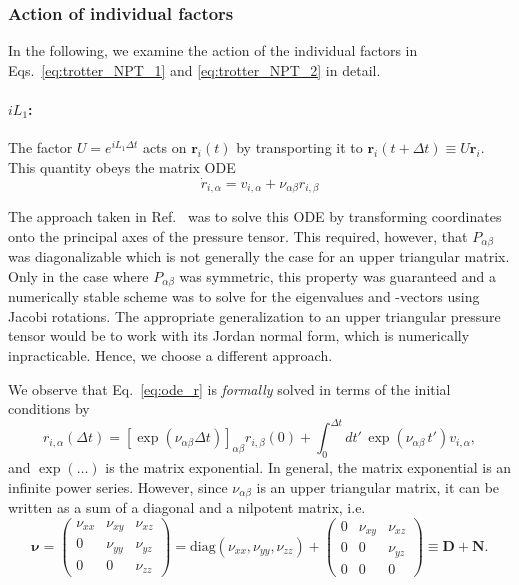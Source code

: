 \documentclass[12pt,letter]{article}
\renewcommand{\vec}[1]{\mathbf{#1}}
\begin{document}
\subsubsection{Action of individual factors}
In the following, we examine the action of the individual factors in
Eqs.~\eqref{eq:trotter_NPT_1} and \eqref{eq:trotter_NPT_2} in detail.

\paragraph{$i L_1$:} The factor $U=e^{i L_1 \Delta t}$ acts on $\vec r_i(t)$ by
transporting it to $\vec r_i(t+\Delta t) \equiv U \vec r_i$.  This quantity obeys the matrix ODE
\begin{equation}
\dot{r}_{i,\alpha} = v_{i,\alpha} + \nu_{\alpha\beta} r_{i,\beta} \label{eq:ode_r}
\end{equation}

The approach taken in Ref.~\cite{Yu2010} was to solve this ODE by transforming coordinates onto the principal axes of the pressure tensor. This required, however, that  $P_{\alpha\beta}$ was diagonalizable which is not generally the case for an upper triangular matrix. Only in the case
where $P_{\alpha\beta}$ was symmetric, this property was guaranteed and a numerically stable scheme was to solve for the eigenvalues and -vectors using Jacobi rotations. The appropriate generalization to an upper triangular pressure tensor would be to work with its Jordan normal form, which is numerically inpracticable. Hence, we choose a different approach.

We observe that Eq.~\eqref{eq:ode_r} is {\em formally} solved in terms of the initial conditions by
\begin{equation}
r_{i,\alpha}(\Delta t) =  [\exp(\nu_{\alpha\beta} \Delta t)]_{\alpha\beta} r_{i,\beta}(0) + \int_0^{\Delta t} dt'\,\exp(\nu_{\alpha\beta}\, t')v_{i,\alpha},\label{eq:r_ode_sol}
\end{equation}
and $\exp(\dots)$ is the matrix exponential. In general, the matrix exponential is an infinite
power series. However, since  $\nu_{\alpha\beta}$ is an upper triangular
matrix, it can be written as a sum of a diagonal and a nilpotent matrix, i.e.
\begin{equation}
\vec\nu=\left(\begin{matrix}
\nu_{xx}&\nu_{xy}&\nu_{xz}\\
0&\nu_{yy}&\nu_{yz}\\
0&0&\nu_{zz}\end{matrix}\right) = \mathrm{diag}(\nu_{xx},\nu_{yy},\nu_{zz}) 
+ \left(\begin{matrix}
0 & \nu_{xy} & \nu_{xz}\\
0 & 0 &\nu_{yz} \\
0 & 0 & 0\end{matrix}\right) \equiv \vec D + \vec N.
\end{equation}
\end{document}
